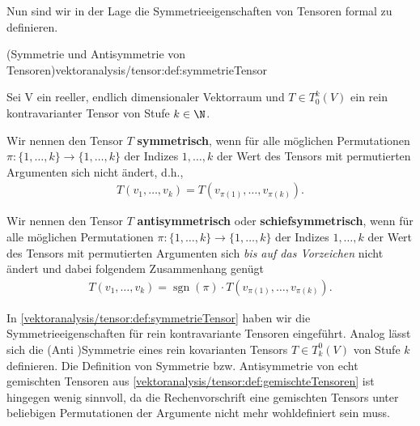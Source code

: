 \documentclass[letterpaper,10pt,english]{jupyterBook}
\begin{document}
\par
Nun sind wir in der Lage die Symmetrieeigenschaften von Tensoren formal zu definieren.
\begin{definition}{(Symmetrie und Antisymmetrie von Tensoren)}{vektoranalysis/tensor:def:symmetrieTensor}



\par
Sei V ein reeller, endlich dimensionaler Vektorraum und \(T \in T_0^k(V)\) ein rein kontravarianter Tensor von Stufe \(k \in \N\).

\par
Wir nennen den Tensor \(T\) \textbf{symmetrisch}, wenn für alle möglichen Permutationen \(\pi \colon \lbrace 1,\ldots, k\rbrace \rightarrow \lbrace 1,\ldots, k\rbrace\) der Indizes \(1,\ldots,k\) der Wert des Tensors mit permutierten Argumenten sich nicht ändert, d.h.,
\begin{align*}
T(v_1, \ldots, v_k) = T(v_{\pi(1)}, \ldots, v_{\pi(k)}).
\end{align*}
\par
Wir nennen den Tensor \(T\) \textbf{antisymmetrisch} oder \textbf{schiefsymmetrisch}, wenn für alle möglichen Permutationen \(\pi \colon \lbrace 1,\ldots, k\rbrace \rightarrow \lbrace 1,\ldots, k\rbrace\) der Indizes \(1,\ldots,k\) der Wert des Tensors mit permutierten Argumenten sich \emph{bis auf das Vorzeichen} nicht ändert und dabei folgendem Zusammenhang genügt
\begin{align*}
T(v_1, \ldots, v_k) = \operatorname{sgn}(\pi) \cdot T(v_{\pi(1)}, \ldots, v_{\pi(k)}).
\end{align*}\end{definition}

\par
In \cref{vektoranalysis/tensor:def:symmetrieTensor} haben wir die Symmetrieeigenschaften für rein kontravariante Tensoren eingeführt.
Analog lässt sich die (Anti )Symmetrie eines rein kovarianten Tensors \(T \in T_k^0(V)\) von Stufe \(k\) definieren.
Die Definition von Symmetrie bzw. Antisymmetrie von echt gemischten Tensoren aus \cref{vektoranalysis/tensor:def:gemischteTensoren} ist hingegen wenig sinnvoll, da die Rechenvorschrift eine gemischten Tensors unter beliebigen Permutationen der Argumente nicht mehr wohldefiniert sein muss.
\end{document}
